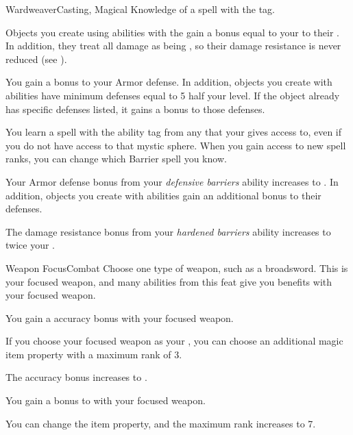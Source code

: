     \begin{magicalfeat}{Wardweaver}{Casting, Magical}
        \featpre Knowledge of a spell with the  tag.

         Objects you create using abilities with the   gain a bonus equal to your  to their .
        In addition, they treat all damage as being , so their damage resistance is never reduced (see ).

         You gain a  bonus to your Armor defense.
        In addition, objects you create with  abilities have minimum defenses equal to 5 \add half your level.
        If the object already has specific defenses listed, it gains a  bonus to those defenses.

         You learn a spell with the  ability tag from any  that your  gives access to, even if you do not have access to that mystic sphere.
        When you gain access to new spell ranks, you can change which Barrier spell you know.

         Your Armor defense bonus from your \textit{defensive barriers} ability increases to .
        In addition, objects you create with  abilities gain an additional  bonus to their defenses.

         The damage resistance bonus from your \textit{hardened barriers} ability increases to twice your .
    \end{magicalfeat}

    \begin{feat}{Weapon Focus}{Combat}
         Choose one type of weapon, such as a broadsword.
        This is your focused weapon, and many abilities from this feat give you benefits with your focused weapon.

         You gain a  accuracy bonus with your focused weapon.

         If you choose your focused weapon as your , you can choose an additional magic item property with a maximum rank of 3.

         The accuracy bonus increases to .

         You gain a  bonus to  with your focused weapon.

         You can change the item property, and the maximum rank increases to 7.
    \end{feat}

